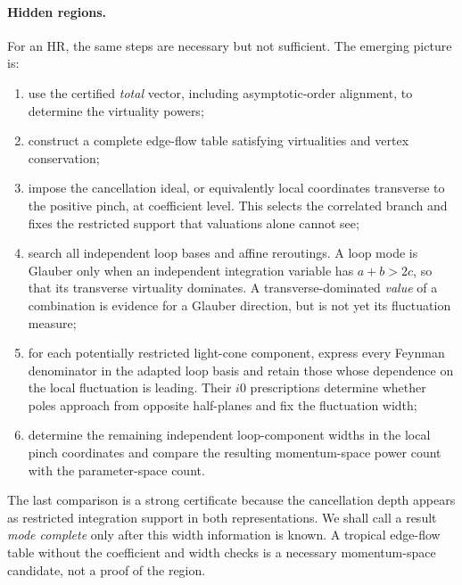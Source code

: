 \documentclass[a4paper,11pt]{article}
\begin{document}
\paragraph{Hidden regions.}

For an HR, the same steps are necessary but not sufficient.  The emerging
picture is:
\begin{enumerate}[label=(\roman*)]
 \item use the certified \emph{total} vector, including asymptotic-order
 alignment, to determine the virtuality powers;
 \item construct a complete edge-flow table satisfying virtualities and
 vertex conservation;
 \item impose the cancellation ideal, or equivalently local coordinates
 transverse to the positive pinch, at coefficient level.  This selects the
 correlated branch and fixes the restricted support that valuations alone
 cannot see;
 \item search all independent loop bases and affine reroutings.  A loop mode
 is Glauber only when an independent integration variable has
 \(a+b>2c\), so that its transverse virtuality dominates.  A
 transverse-dominated \emph{value} of a combination is evidence for a
 Glauber direction, but is not yet its fluctuation measure;
 \item for each potentially restricted light-cone component, express every
 Feynman denominator in the adapted loop basis and retain those whose
 dependence on the local fluctuation is leading.  Their \(i0\) prescriptions
 determine whether poles approach from opposite half-planes and fix the
 fluctuation width;
 \item determine the remaining independent loop-component widths in the
 local pinch coordinates and compare the resulting momentum-space power
 count with the parameter-space count.
\end{enumerate}
The last comparison is a strong certificate because the cancellation depth
appears as restricted integration support in both representations.  We shall
call a result \emph{mode complete} only after this width information is
known.  A tropical edge-flow table without the coefficient and width checks
is a necessary momentum-space candidate, not a proof of the region.
\end{document}
